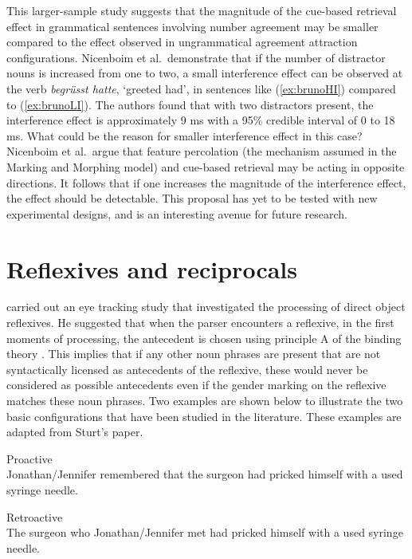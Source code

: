 \documentclass{cambridge7A}\usepackage[]{graphicx}\usepackage[]{color}
\begin{document}
This larger-sample study suggests that the magnitude of the  cue-based retrieval effect in  grammatical sentences involving number agreement may be smaller compared to the effect observed in ungrammatical agreement attraction configurations.  Nicenboim et al.\ demonstrate that if the number of distractor  nouns is increased from one to two, a small interference effect can be observed at the verb \textit{begr\"usst hatte}, `greeted had', in  sentences like (\ref{ex:brunoHI})  compared to (\ref{ex:brunoLI}). The authors found that with two distractors present, the interference effect is approximately 9 ms with a 95\% credible interval of 0 to 18 ms. What could be the reason for smaller interference effect in this case?  Nicenboim et al.\ argue that feature percolation (the mechanism assumed in the Marking and Morphing model) and cue-based retrieval may be acting in opposite directions. It follows that if one increases the magnitude of the interference effect, the effect should be detectable. This  proposal has yet to be  tested with new experimental designs, and is an interesting avenue for future research.
  
\section{Reflexives and reciprocals}

\cite{Sturt2003} carried out an eye tracking study that investigated the processing of direct object reflexives. He suggested that when the parser encounters a  reflexive,  in the first moments of processing, the antecedent is chosen using principle A of the  binding theory \citep{chomsky1981lectures}.   
 This implies that if any other noun phrases are present that are not syntactically licensed as antecedents of the reflexive, these would never be considered as possible antecedents even if the gender marking on the reflexive matches these noun phrases. Two examples are shown below  to illustrate  the two basic configurations that have been studied in the literature. These examples are adapted from Sturt's paper.
 
\begin{exe} 
\ex
\begin{xlist}
\item Proactive \label{reflpro}\\
Jonathan/Jennifer remembered that the surgeon had pricked himself with a used syringe needle.
  \item Retroactive \label{reflretro}\\
  The surgeon  who Jonathan/Jennifer  met had pricked himself with a used syringe needle.
\end{xlist}
\end{exe}
 
\end{document}
